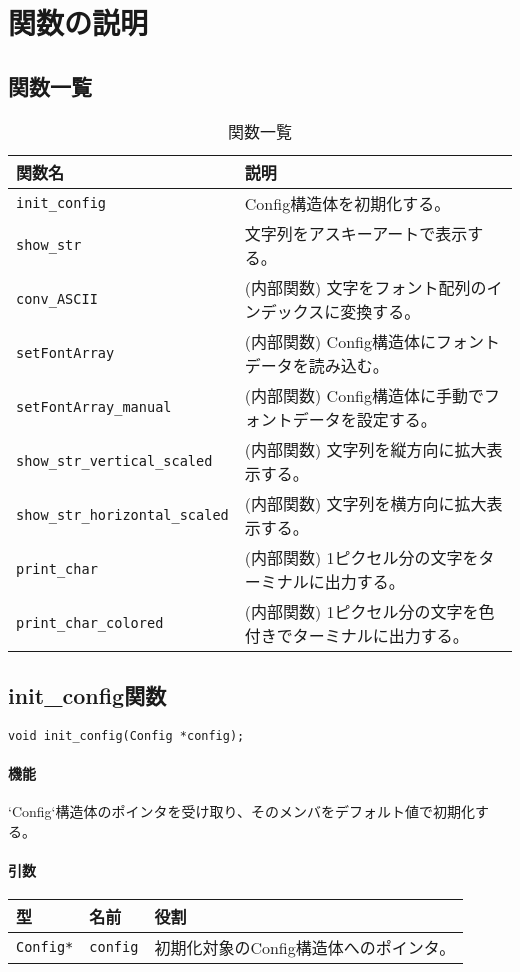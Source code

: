\documentclass[uplatex]{jsarticle}
\begin{document}
\section{関数の説明}
\subsection{関数一覧}
\begin{table}[H]
    \centering
    \caption{関数一覧}
    \begin{tabular}{|l|p{9cm}|}
        \hline
        \textbf{関数名} & \textbf{説明} \\ \hline
        \texttt{init\_config} & Config構造体を初期化する。 \\ \hline
        \texttt{show\_str} & 文字列をアスキーアートで表示する。 \\ \hline
        \texttt{conv\_ASCII} & (内部関数) 文字をフォント配列のインデックスに変換する。 \\ \hline
        \texttt{setFontArray} & (内部関数) Config構造体にフォントデータを読み込む。 \\ \hline
        \texttt{setFontArray\_manual} & (内部関数) Config構造体に手動でフォントデータを設定する。 \\ \hline
        \texttt{show\_str\_vertical\_scaled} & (内部関数) 文字列を縦方向に拡大表示する。 \\ \hline
        \texttt{show\_str\_horizontal\_scaled} & (内部関数) 文字列を横方向に拡大表示する。 \\ \hline
        \texttt{print\_char} & (内部関数) 1ピクセル分の文字をターミナルに出力する。 \\ \hline
        \texttt{print\_char\_colored} & (内部関数) 1ピクセル分の文字を色付きでターミナルに出力する。 \\ \hline
    \end{tabular}
\end{table}

\subsection{init\_config関数}
\texttt{void init\_config(Config *config);}
\paragraph{機能}
`Config`構造体のポインタを受け取り、そのメンバをデフォルト値で初期化する。

\paragraph{引数}
\begin{center}
    \begin{tabular}{|l|l|p{7.5cm}|}
        \hline
        \textbf{型} & \textbf{名前} & \textbf{役割} \\ \hline
        \texttt{Config*} & \texttt{config} & 初期化対象のConfig構造体へのポインタ。 \\ \hline
    \end{tabular}
\end{center}
\end{document}
